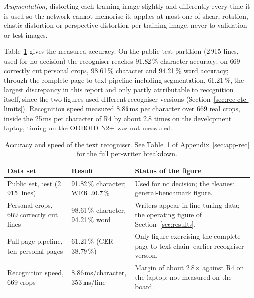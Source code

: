 \emph{Augmentation}, distorting each training image slightly and differently every time it is used so the network cannot memorise it, applies at most one of shear, rotation, elastic distortion or perspective distortion per training image, never to validation or test images.

Table~\ref{tab:rec-results} gives the measured accuracy. On the public test partition (2\,915 lines, used for no decision) the recogniser reaches 91.82\,\% character accuracy; on 669 correctly cut personal crops, 98.61\,\% character and 94.21\,\% word accuracy; through the complete page-to-text pipeline including segmentation, 61.21\,\%, the largest discrepancy in this report and only partly attributable to recognition itself, since the two figures used different recogniser versions (Section~\ref{sec:rec-ctc-limits}). Recognition speed measured 8.86\,ms per character over 669 real crops, inside the 25\,ms per character of R4 by about 2.8 times on the development laptop; timing on the ODROID N2+ was not measured. 

\begin{table}[h]
\centering
\fontsize{8.5}{10.2}\selectfont
\setlength{\tabcolsep}{4pt}
\begin{tabularx}{\linewidth}{|p{3.1cm}|p{2.7cm}|X|}
\hline
\textbf{Data set} & \textbf{Result} & \textbf{Status of the figure} \\
\hline
Public set, test (2\,915 lines) & 91.82\,\% character; WER 26.7\,\% & Used for no decision; the cleanest general-benchmark figure. \\
\hline
Personal crops, 669 correctly cut lines & 98.61\,\% character, 94.21\,\% word & Writers appear in fine-tuning data; the operating figure of Section~\ref{sec:results}. \\
\hline
Full page pipeline, ten personal pages & 61.21\,\% (CER 38.79\,\%) & Only figure exercising the complete page-to-text chain; earlier recogniser version. \\
\hline
Recognition speed, 669 crops & 8.86\,ms/character, 353\,ms/line & Margin of about 2.8$\times$ against R4 on the laptop; not measured on the board. \\
\hline
\end{tabularx}
\caption{Accuracy and speed of the text recogniser. See Table~\ref{tab:rec-results} of Appendix~\ref{sec:app-rec} for the full per-writer breakdown.}
\label{tab:rec-results}
\end{table}

